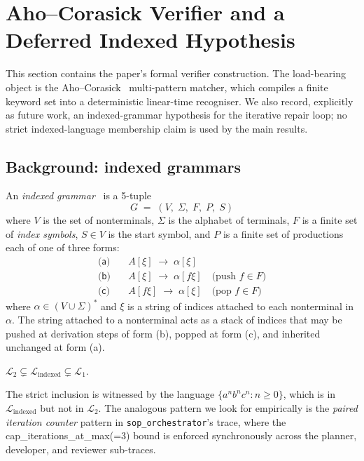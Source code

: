 \section{Aho--Corasick Verifier and a Deferred Indexed Hypothesis}
\label{sec:indexed}

This section contains the paper's formal verifier construction.  The
load-bearing object is the Aho--Corasick~\cite{aho1975corasick}
multi-pattern matcher, which compiles a finite keyword set into a
deterministic linear-time recogniser.  We also record, explicitly as
future work, an indexed-grammar hypothesis for the iterative repair
loop; no strict indexed-language membership claim is used by the main
results.

\subsection{Background: indexed grammars}

An \emph{indexed grammar}~\cite{aho1968indexed} is a 5-tuple
\[
G \;=\; (V,\;\Sigma,\;F,\;P,\;S)
\]
where $V$ is the set of nonterminals, $\Sigma$ is the alphabet
of terminals, $F$ is a finite set of \emph{index symbols}, $S\in
V$ is the start symbol, and $P$ is a finite set of productions
each of one of three forms:
\begin{align*}
\textsf{(a)}\quad & A[\xi] \;\to\; \alpha[\xi] \\
\textsf{(b)}\quad & A[\xi] \;\to\; \alpha[f\xi]
                    \quad\text{(push } f\in F \text{)}\\
\textsf{(c)}\quad & A[f\xi] \;\to\; \alpha[\xi]
                    \quad\text{(pop } f\in F \text{)}
\end{align*}
where $\alpha\in (V\cup\Sigma)^*$ and $\xi$ is a string of
indices attached to each nonterminal in $\alpha$.  The string
attached to a nonterminal acts as a stack of indices that may be
pushed at derivation steps of form (b), popped at form (c), and
inherited unchanged at form (a).

\begin{lemma}[Aho 1968]
$\mathcal{L}_2 \subsetneq \mathcal{L}_{\mathrm{indexed}}
\subsetneq \mathcal{L}_1$.
\end{lemma}

The strict inclusion is witnessed by the language $\{a^n b^n c^n :
n\ge 0\}$, which is in $\mathcal{L}_{\mathrm{indexed}}$ but not in
$\mathcal{L}_2$.  The analogous pattern we look for empirically is the
\emph{paired iteration counter} pattern in
\texttt{sop\_orchestrator}'s trace, where the
\textsf{cap\_iterations\_at\_max(=3)} bound is enforced
synchronously across the planner, developer, and reviewer
sub-traces.

